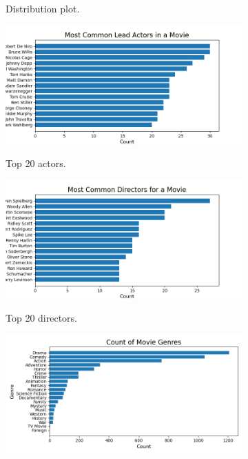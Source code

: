 \documentclass[12pt]{article}
\begin{document}
\begin{figure}[H]
\begin{subfigure}[b]{0.33\textwidth}
\label{fig:sub2}
\caption{Distribution plot.}
\end{subfigure}
\begin{subfigure}[b]{0.33\textwidth}
\centering
\includegraphics[width=1\textwidth]{images/george_viz/count_actors.png}
\label{fig:sub1}
\caption{Top 20 actors.}
\end{subfigure}
\hfill
\begin{subfigure}[b]{0.32\textwidth}
\centering
\includegraphics[width=1\textwidth]{images/george_viz/count_directors.png}
\label{fig:sub1}
\caption{Top 20 directors.}
\end{subfigure}
\hfill
\begin{subfigure}[b]{0.33\textwidth}
\centering
\includegraphics[width=1\textwidth]{images/george_viz/count_movie_genres.png}

\end{subfigure}
\end{figure}
\end{document}
